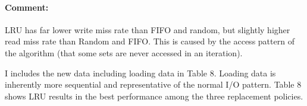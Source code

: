 \documentclass[11pt]{article}
\begin{document}
\paragraph{Comment:}\label{comment}

LRU has far lower write miss rate than FIFO and random, but slightly
higher read miss rate than Random and FIFO. This is caused by the access
pattern of the algorithm (that some sets are never accessed in an
iteration).

I includes the new data including loading data in Table 8. Loading data
is inherently more sequential and representative of the normal I/O
pattern. Table 8 shows LRU results in the best performance among the
three replacement policies.


    
    
    
    
\end{document}

